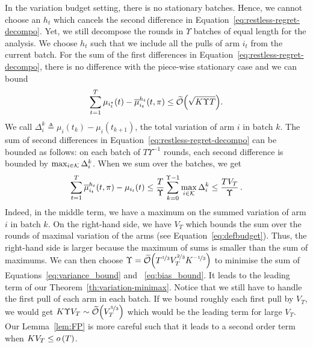 In the variation budget setting, there is no stationary batches. Hence, we cannot choose an $h_t$ which cancels the second difference in Equation~\ref{eq:restless-regret-decompo}. Yet, we still decompose the rounds in $\Upsilon$ batches of equal length for the analysis. We choose $h_t$ such that we include all the pulls of arm $i_t$ from the current batch. For the sum of the first differences in Equation~\ref{eq:restless-regret-decompo}, there is no difference with the piece-wise stationary case and we can bound
\vspace{-4pt}
\begin{equation}
\label{eq:variance_bound}
    \sum_{t=1}^T \mu_{i_t^\star}(t) - \overline{\mu}_{i_t}^{h_t}(t, \pi)\leq \widetilde{\mathcal{O}}{\left(\sqrt{K\Upsilon T}\right)}.
\end{equation}
We call $\Delta_i^k \triangleq \mu_i(t_k) - \mu_i(t_{k+1})$, the total variation of arm $i$ in batch $k$. The sum of second differences in Equation~\ref{eq:restless-regret-decompo} can be bounded as follows: on each batch of $T\Upsilon^{-1}$ rounds, each second difference is bounded by $\max_{i\in \mathcal{K}} \Delta_i^k$. When we sum over the batches, we get
\vspace{-4pt}
\begin{equation}
\label{eq:bias_bound}
  \sum_{t=1}^T  \overline{\mu}_{i_t}^{h_t}(t, \pi) - \mu_{i_t}(t)\leq \frac{T}{\Upsilon}\sum_{k=0}^{\Upsilon-1}\max_{i \in \mathcal{K}}\Delta_i^k  \leq \frac{TV_T}{\Upsilon}\, .  
\end{equation}
Indeed, in the middle term, we have a maximum on the summed variation of arm $i$ in batch $k$. On the right-hand side, we have $V_T$ which bounds the sum over the rounds of maximal variation of the arms (see Equation~\ref{eq:defbudget}). Thus, the right-hand side is larger because the maximum of sums is smaller than the sum of maximums. We can then choose $\Upsilon = \widetilde{\mathcal{O}}{\left(T^{\nicefrac{1}{3}}V_T^{\nicefrac{2}{3}}K^{\nicefrac{-1}{3}}\right)}$ to minimise the sum of Equations~\ref{eq:variance_bound} and ~\ref{eq:bias_bound}. It leads to the leading term of our Theorem~\ref{th:variation-minimax}. Notice that we still have to handle the first pull of each arm in each batch. If we bound roughly each first pull by $V_T$, we would get $K\Upsilon V_T \sim \widetilde{\mathcal{O}}{\left(V_T^{\nicefrac{5}{3}}\right)}$ which would be the leading term for large $V_T$. Our Lemma~\ref{lem:FP} is more careful such that it leads to a second order term when $KV_T \leq o\left(T\right)$.

